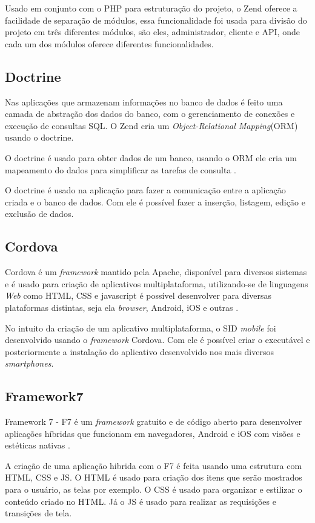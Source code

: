 Usado em conjunto com o PHP para estruturação do projeto, o Zend oferece a facilidade de separação de módulos, essa funcionalidade foi usada para divisão do projeto em três diferentes módulos, são eles, administrador, cliente e API, onde cada um dos módulos oferece diferentes funcionalidades.

\subsection{Doctrine}
Nas aplicações que armazenam informações no banco de dados é feito uma camada de abstração dos dados do banco, com o gerenciamento de conexões e execução de consultas SQL. O Zend cria um \textit{Object-Relational Mapping}(ORM) usando o doctrine.

O doctrine é usado para obter dados de um banco, usando o ORM ele cria um mapeamento do dados para simplificar as tarefas de consulta \cite[p.102]{vaswani2010}.

O doctrine é usado na aplicação para fazer a comunicação entre a aplicação criada e o banco de dados. Com ele é possível fazer a inserção, listagem, edição e exclusão de dados.

\subsection{Cordova}
Cordova é um \textit{framework} mantido pela Apache, disponível para diversos sistemas e é usado para criação de aplicativos multiplataforma, utilizando-se de linguagens \textit{Web} como HTML, CSS e javascript é possível desenvolver para diversas plataformas distintas, seja ela \textit{browser}, Android, iOS e outras \cite{prezotto2017}.

No intuito da criação de um aplicativo multiplataforma, o SID \textit{mobile} foi desenvolvido usando o \textit{framework} Cordova. Com ele é possível criar o executável e posteriormente a instalação do aplicativo desenvolvido nos mais diversos \textit{smartphones}.

\subsection{Framework7}
Framework 7 - F7 é um \textit{framework} gratuito e de código aberto para desenvolver aplicações híbridas que funcionam em navegadores, Android e iOS com visões e estéticas nativas \cite{f72018}.

A criação de uma aplicação hibrida com o F7 é feita usando uma estrutura com HTML, CSS e JS. O HTML é usado para criação dos itens que serão mostrados para o usuário, as telas por exemplo. O CSS é usado para organizar e estilizar o conteúdo criado no HTML. Já o JS é usado para realizar as requisições e transições de tela.